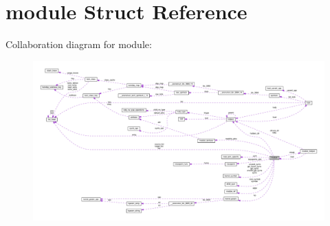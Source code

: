 \hypertarget{structmodule}{}\section{module Struct Reference}
\label{structmodule}


Collaboration diagram for module\+:
\nopagebreak
\begin{figure}[H]
\begin{center}
\leavevmode
\includegraphics[width=350pt]{structmodule__coll__graph}
\end{center}
\end{figure}
